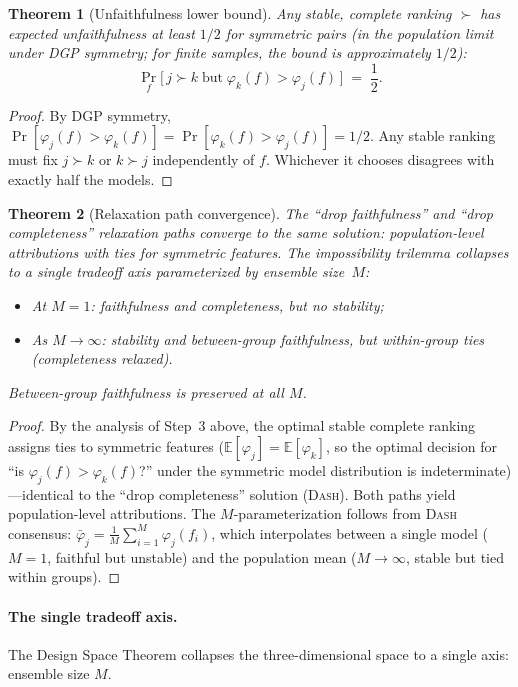 \documentclass{article}
\newtheorem{theorem}{Theorem}
\newcommand{\E}{\mathbb{E}}
\newcommand{\DASH}{\textsc{Dash}}
\begin{document}
\begin{theorem}[Unfaithfulness lower bound]
\label{thm:unfaithfulness-bound}
Any stable, complete ranking $\succ$ has expected unfaithfulness at least $1/2$ for symmetric pairs (in the population limit under DGP symmetry; for finite samples, the bound is approximately $1/2$):
\[
    \Pr_f\bigl[\, j \succ k \;\text{but}\; \varphi_k(f) > \varphi_j(f) \,\bigr] \;=\; \frac{1}{2}.
\]
\end{theorem}

\begin{proof}
By DGP symmetry, $\Pr[\varphi_j(f) > \varphi_k(f)] = \Pr[\varphi_k(f) > \varphi_j(f)] = 1/2$. Any stable ranking must fix $j \succ k$ or $k \succ j$ independently of $f$. Whichever it chooses disagrees with exactly half the models.
\end{proof}

\begin{theorem}[Relaxation path convergence]
\label{thm:path-convergence}
The ``drop faithfulness'' and ``drop completeness'' relaxation paths converge to the same solution: population-level attributions with ties for symmetric features. The impossibility trilemma collapses to a single tradeoff axis parameterized by ensemble size~$M$:
\begin{itemize}
    \item At $M = 1$: faithfulness and completeness, but no stability;
    \item As $M \to \infty$: stability and between-group faithfulness, but within-group ties (completeness relaxed).
\end{itemize}
Between-group faithfulness is preserved at all $M$.
\end{theorem}

\begin{proof}
By the analysis of Step~3 above, the optimal stable complete ranking assigns ties to symmetric features ($\E[\varphi_j] = \E[\varphi_k]$, so the optimal decision for ``is $\varphi_j(f) > \varphi_k(f)$?'' under the symmetric model distribution is indeterminate)---identical to the ``drop completeness'' solution (\DASH{}). Both paths yield population-level attributions. The $M$-parameterization follows from \DASH{} consensus: $\bar\varphi_j = \frac{1}{M}\sum_{i=1}^M \varphi_j(f_i)$, which interpolates between a single model ($M=1$, faithful but unstable) and the population mean ($M \to \infty$, stable but tied within groups).
\end{proof}

\paragraph{The single tradeoff axis.}
The Design Space Theorem collapses the three-dimensional space to a single axis: ensemble size $M$.
\end{document}
